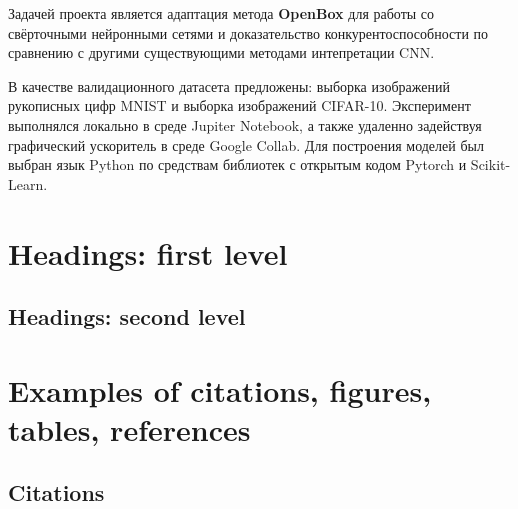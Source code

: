 \documentclass{article}
\begin{document}
Задачей проекта является адаптация метода \textbf{OpenBox} для работы со свёрточными нейронными сетями и доказательство конкурентоспособности по сравнению с другими существующими методами интепретации CNN.

В качестве валидационного датасета предложены: выборка изображений рукописных цифр MNIST и выборка изображений CIFAR-10. Эксперимент выполнялся локально в среде Jupiter Notebook, а также удаленно задействуя графический ускоритель в среде Google Collab. Для построения моделей был выбран язык Python по средствам библиотек с открытым кодом Pytorch и Scikit-Learn.



\section{Headings: first level}
\label{sec:headings}


\subsection{Headings: second level}





\section{Examples of citations, figures, tables, references}

\subsection{Citations}
\end{document}
